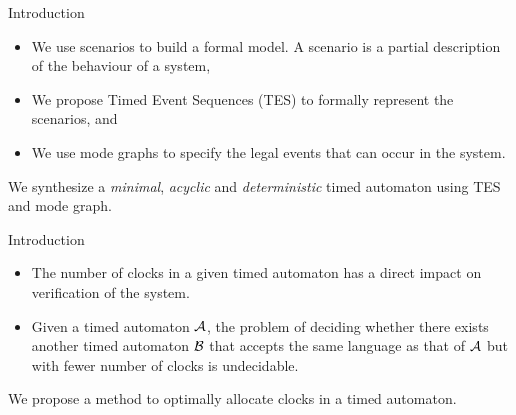 \documentclass[10pt]{beamer}
\theoremstyle{plain}
\theoremstyle{definition}
\begin{document}
\begin{frame}{Introduction}
	\begin{itemize}
		\item We use scenarios to build a formal model. A scenario is a partial description of the behaviour of a system,
		\item We propose Timed Event Sequences (TES) to formally represent the scenarios, and
		\item We use mode graphs to specify the legal events that can occur in the system.
	\end{itemize}
	\alert{We synthesize a \emph{minimal}, \emph{acyclic} and \emph{deterministic} timed automaton using TES and mode graph.}
\end{frame}


\begin{frame}{Introduction}
	\begin{itemize}
		\item The number of clocks in a given timed automaton has a direct impact on verification of the system.
		\item Given a timed automaton $\cal A$, the problem of deciding whether there exists another timed automaton $\cal B$ that accepts the same language as that of $\cal A$ but with fewer number of clocks is undecidable.
		
	\end{itemize}
	\vspace{0.5cm}
	
	\alert{We propose a method to optimally allocate clocks in a timed automaton.}
\end{frame}
\end{document}
